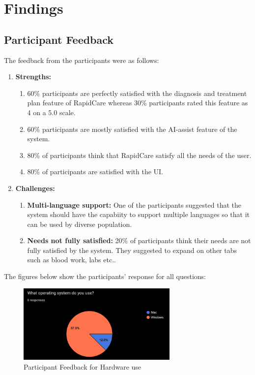 \documentclass{article}
\begin{document}
\newpage

\section{Findings}

\subsection{Participant Feedback}

The feedback from the participants were as follows:

\begin{enumerate}
    \item \textbf{Strengths:}
    \begin{enumerate}
        \item 60\% participants are perfectly satisfied with the diagnosis and treatment plan feature of RapidCare whereas 30\% participants rated this feature as 4 on a 5.0 scale.
        \item 60\% participants are mostly satisfied with the AI-assist feature of the system.
        \item 80\% of participants think that RapidCare satisfy all the needs of the user.
        \item 80\% of participants are satisfied with the UI.
    \end{enumerate}
    \item \textbf{Challenges:}
    \begin{enumerate}
        \item \textbf{Multi-language support:} One of the participants suggested that the system should have the capabiity to support multiple languages so that it can be used by diverse population. 
        \item \textbf{Needs not fully satisfied:} 20\% of participants think their needs are not fully satisfied by the system. They suggested to expand on other tabs such as blood work, labs etc..
    \end{enumerate}
\end{enumerate}

The figures below show the participants' response for all questions:

\begin{figure}[h]
    \centering
    \includegraphics[width=0.7\textwidth]{Hardware.png}
    \caption{Participant Feedback for Hardware use}
    \label{FigUH}
\end{figure}
\end{document}

